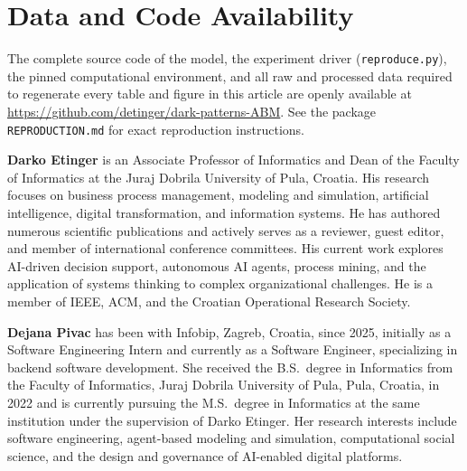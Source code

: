 \documentclass[a4paper,fleqn]{cas-sc}
\begin{document}


\section*{Data and Code Availability}
\label{sec:availability}
The complete source code of the model, the experiment driver (\texttt{reproduce.py}), the pinned computational environment, and all raw and processed data required to regenerate every table and figure in this article are openly available at \url{https://github.com/detinger/dark-patterns-ABM}. See the package \texttt{REPRODUCTION.md} for exact reproduction instructions.





\bio{}
\textbf{Darko Etinger} is an Associate Professor of Informatics and Dean of the Faculty of Informatics at the Juraj Dobrila University of Pula, Croatia. His research focuses on business process management, modeling and simulation, artificial intelligence, digital transformation, and information systems. He has authored numerous scientific publications and actively serves as a reviewer, guest editor, and member of international conference committees. His current work explores AI-driven decision support, autonomous AI agents, process mining, and the application of systems thinking to complex organizational challenges. He is a member of IEEE, ACM, and the Croatian Operational Research Society.
\endbio

\bio{}
\textbf{Dejana Pivac} has been with Infobip, Zagreb, Croatia, since 2025, initially as a Software Engineering Intern and currently as a Software Engineer, specializing in backend software development. She received the B.S.\ degree in Informatics from the Faculty of Informatics, Juraj Dobrila University of Pula, Pula, Croatia, in 2022 and is currently pursuing the M.S.\ degree in Informatics at the same institution under the supervision of Darko Etinger. Her research interests include software engineering, agent-based modeling and simulation, computational social science, and the design and governance of AI-enabled digital platforms.
\endbio
\end{document}
